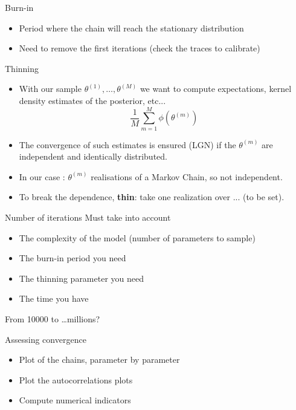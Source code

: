 \begin{frame}{Burn-in}
\begin{itemize}
 \item Period where the chain will reach the stationary distribution
 \item Need to remove the first iterations (check the traces to calibrate)
\end{itemize}
 
\end{frame}
\begin{frame}{Thinning}
\begin{itemize}
 \item With our sample $\theta^{(1)}, \dots, \theta^{(M)}$ we want to compute expectations, kernel density estimates of the posterior, etc...
 $$ \frac{1}{M}\sum_{m=1}^M \phi(\theta^{(m)})$$
 \item The convergence of such estimates is ensured (LGN) if the $\theta^{(m)}$ are independent and identically distributed.  
 \item In our case : $\theta^{(m)}$ realisations of a Markov Chain, so not independent. 
 \item To break the dependence, \color{dgreen} \textbf{thin}\color{black}: take one realization over ... (to be set). 
 \end{itemize}

\end{frame}
\begin{frame}{Number of iterations}
Must take into account

\begin{itemize}
 \item The complexity of the model (number of parameters to sample)
 \item The burn-in period you need
 \item The thinning parameter you need
 \item The time you have
\end{itemize}
From 10000 to \dots  millions?
\end{frame}
\begin{frame}{Assessing convergence}
\begin{itemize}
 \item Plot of the chains, parameter by parameter
 \item Plot the autocorrelations plots
 \item Compute numerical indicators
\end{itemize}

\end{frame}
